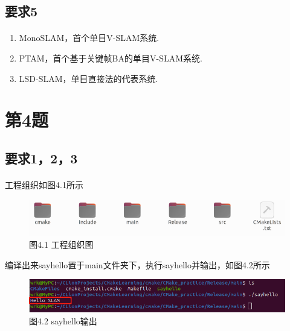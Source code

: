 \documentclass[40pt,a4paper，UTF8]{ctexart}
\begin{document}
\paragraph{}



\subsection{要求5} 
\paragraph{}
\begin{enumerate}
\item MonoSLAM，首个单目V-SLAM系统\cite{ref2}.
\item PTAM，首个基于关键帧BA的单目V-SLAM系统\cite{ref3}.
\item LSD-SLAM，单目直接法的代表系统\cite{ref4}.
\end{enumerate}



\paragraph{}

\section{第4题}

\subsection{要求1，2，3} 
\paragraph{}
工程组织如图4.1所示


\begin{figure}[H]
\centering
\includegraphics[width=4.8in]{ch1_4_1.png} {图4.1 工程组织图}
\end{figure}


编译出来sayhello置于main文件夹下，执行sayhello并输出，如图4.2所示
\begin{figure}[H]
\centering
\includegraphics[width=4.8in]{ch1_4_2.png} {图4.2 sayhello输出}
\end{figure}
\end{document}
